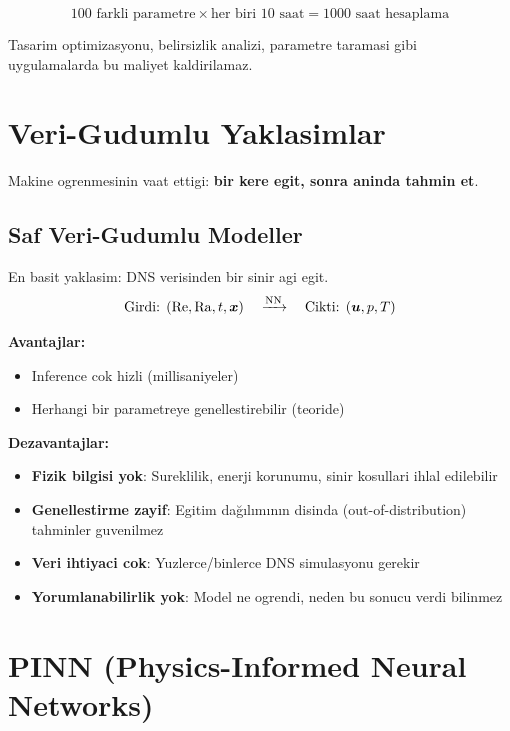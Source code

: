 \begin{equation}
\text{100 farkli parametre} \times \text{her biri 10 saat} = \text{1000 saat hesaplama}
\end{equation}

Tasarim optimizasyonu, belirsizlik analizi, parametre taramasi gibi uygulamalarda bu maliyet kaldirilamaz.


\section{Veri-Gudumlu Yaklasimlar}
\label{sec:data_driven}

Makine ogrenmesinin vaat ettigi: \textbf{bir kere egit, sonra aninda tahmin et}.

\subsection{Saf Veri-Gudumlu Modeller}

En basit yaklasim: DNS verisinden bir sinir agi egit.
\begin{equation}
\text{Girdi: } (\mathrm{Re}, \mathrm{Ra}, t, \bm{x}) \quad\xrightarrow{\text{NN}}\quad \text{Cikti: } (\bm{u}, p, T)
\end{equation}

\textbf{Avantajlar:}
\begin{itemize}
\item Inference cok hizli (millisaniyeler)
\item Herhangi bir parametreye genellestirebilir (teoride)
\end{itemize}

\textbf{Dezavantajlar:}
\begin{itemize}
\item \textbf{Fizik bilgisi yok}: Sureklilik, enerji korunumu, sinir kosullari ihlal edilebilir
\item \textbf{Genellestirme zayif}: Egitim dağılımının disinda (out-of-distribution) tahminler guvenilmez
\item \textbf{Veri ihtiyaci cok}: Yuzlerce/binlerce DNS simulasyonu gerekir
\item \textbf{Yorumlanabilirlik yok}: Model ne ogrendi, neden bu sonucu verdi bilinmez
\end{itemize}


\section{PINN (Physics-Informed Neural Networks)}
\label{sec:pinn}

